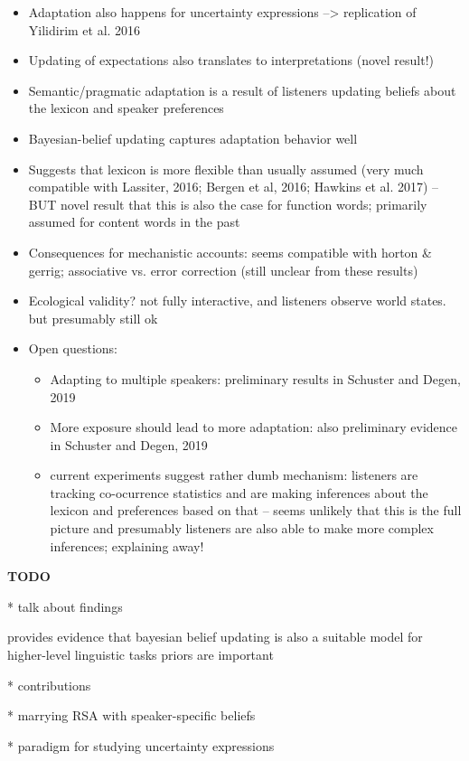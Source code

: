 \documentclass[lucida,biblatex]{sp} %
\begin{document}
\begin{itemize}
\item Adaptation also happens for uncertainty expressions --> replication of Yilidirim et al. 2016
\item Updating of expectations also translates to interpretations (novel result!)
\item Semantic/pragmatic adaptation is a result of listeners updating beliefs about the lexicon and speaker preferences
\item Bayesian-belief updating captures adaptation behavior well
\item Suggests that lexicon is more flexible than usually assumed (very much compatible with Lassiter, 2016; Bergen et al, 2016; Hawkins et al. 2017) -- BUT novel result that this is also the case for function words; primarily assumed for content words in the past
\item Consequences for mechanistic accounts: seems compatible with horton \& gerrig; associative vs. error correction (still unclear from these results)
\item Ecological validity? not fully interactive, and listeners observe world states. but presumably still ok
\item Open questions:
\begin{itemize}
\item Adapting to multiple speakers: preliminary results in Schuster and Degen, 2019
\item More exposure should lead to more adaptation: also preliminary evidence in Schuster and Degen, 2019
\item current experiments suggest rather dumb mechanism: listeners are tracking co-ocurrence statistics and 
are making inferences about the lexicon and preferences based on that -- seems unlikely that this is the full picture and
presumably listeners are also able to make more complex inferences; explaining away!
\end{itemize}
\end{itemize}


{\bf TODO} 

* talk about findings

provides evidence that bayesian belief updating is also a suitable model for higher-level linguistic tasks
priors are important




* contributions
	
	* marrying RSA with speaker-specific beliefs
	
	 * paradigm for studying uncertainty expressions
	
\end{document}
